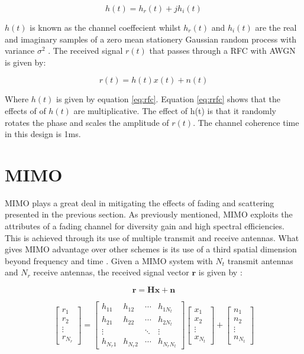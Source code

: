 \documentclass[11pt]{report}
\renewcommand{\vec}[1]{\mathbf{#1}} %
\begin{document}
\begin{equation}
  \label{eq:rfc}
  h(t) = h_r(t) + jh_i(t)
\end{equation}

$h(t)$ is known as the channel coeffecient whilst $h_r(t)$ and $h_i(t)$ are the real and imaginary samples of a zero mean stationery Gaussian random process with variance $\sigma^2$ \cite{34}. The received signal $r(t)$ that passes through a RFC with AWGN is given by:

\begin{equation}
	\label{eq:rrfc}
	r(t) = h(t)x(t) + n(t)
\end{equation}

Where $ h(t) $ is given by equation \ref{eq:rfc}. Equation \ref{eq:rrfc} shows that the effects of of $ h(t) $ are multiplicative. The effect of h(t) is that it randomly rotates the phase and scales the amplitude of $r(t)$\cite{73}. The channel coherence time in this design is 1ms.

\section{MIMO}
\label{sec:mimo}
MIMO plays a great deal in mitigating the effects of fading and scattering presented in the previous section. As previously mentioned, MIMO exploits the attributes of a fading channel for diversity gain and high spectral efficiencies. This is achieved through its use of multiple transmit and receive antennas. What gives MIMO advantage over other schemes is its use of a third spatial dimension beyond frequency and time \cite{74}. Given a MIMO system with $N_t$ transmit antennas and $N_r$ receive antennas, the received signal vector $\vec{r}$ is given by :

\begin{equation}
\label{eq:mimo}
\vec{r} = \vec{H}\vec{x} + \vec{n}
\end{equation}

\begin{equation}
\label{eq:H}
\begin{bmatrix}
r_1 \\
r_2 \\
\vdots\\
r_{N_r}
\end{bmatrix}  = \begin{bmatrix}
h_{11} & h_{12} & \cdots & h_{1N_t} \\
h_{21} & h_{22} & \cdots & h_{2N_t} \\
\vdots &        &  \ddots      &  \vdots  \\
h_{N_r1}& h_{N_r2}&\cdots &h_{N_rN_t}
\end{bmatrix}
\begin{bmatrix}
x_1 \\
x_2 \\
\vdots\\
x_{N_t}
\end{bmatrix} + 
\begin{bmatrix}
n_1 \\
n_2 \\
\vdots\\
n_{N_t}
\end{bmatrix}  
\end{equation}
\end{document}
